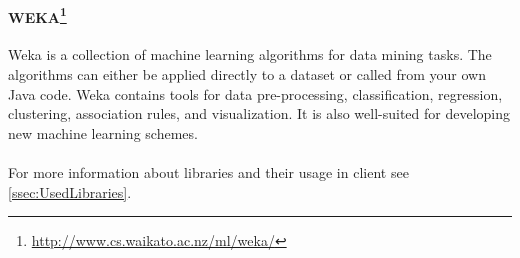 
\paragraph{WEKA\footnote{\url{http://www.cs.waikato.ac.nz/ml/weka/}}}
Weka is a collection of machine learning algorithms for data mining tasks.
The algorithms can either be applied directly to a dataset or called from your
own Java code. Weka contains tools for data pre-processing, classification,
regression, clustering, association rules, and visualization. It is also
well-suited for developing new machine learning schemes.

\paragraph{} For more information about libraries and their usage in client see
\ref{ssec:UsedLibraries}.